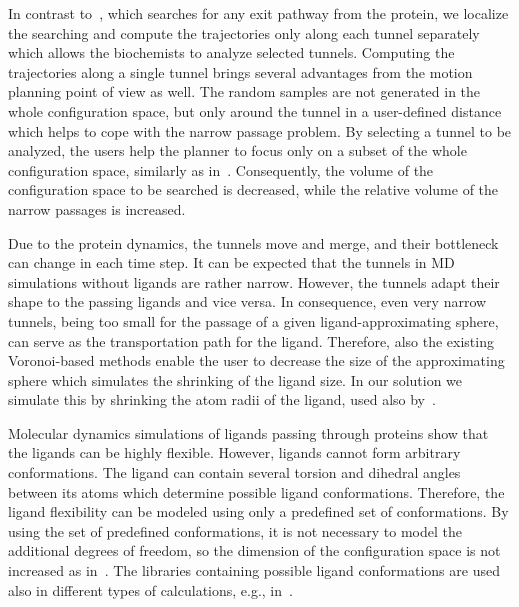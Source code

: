 \documentclass[usletter, 10pt, conference]{ieeeconf} %
\begin{document}
In contrast to~\cite{cortes2010simulating}, which searches for any exit pathway from the protein, we localize the searching and compute the trajectories only along each tunnel separately which allows the biochemists to analyze selected tunnels.
Computing the trajectories along a single tunnel brings several advantages from the motion planning point of view as well.
The random samples are not generated in the whole configuration space, but only around the tunnel in a user-defined distance which helps to cope with the narrow passage problem.
By selecting a tunnel to be analyzed, the users help the planner to focus only on a subset of the whole configuration
space, similarly as in~\cite{denny2018general}.
Consequently, the volume of the configuration space to be searched is decreased, while the relative volume of the narrow passages is increased.

Due to the protein dynamics, the tunnels move and merge, and their bottleneck can change in each time step.
It can be expected that the tunnels in MD simulations without ligands are rather narrow.
However, the tunnels adapt their shape to the passing ligands and vice versa.
In consequence, even very narrow tunnels, being too small for the passage of a given ligand-approximating sphere, can serve as the transportation path for the ligand.
Therefore, also the existing Voronoi-based methods enable the user to decrease the size of the approximating sphere which simulates the shrinking of the ligand size.
In our solution we simulate this by shrinking the atom radii of the ligand, used also by~\cite{cortes2010simulating,guieysse2008structure}.

Molecular dynamics simulations of ligands passing through proteins show that the ligands can be highly flexible.
However, ligands cannot form arbitrary conformations. 
The ligand can contain several torsion and dihedral angles between its atoms which determine possible ligand conformations.
Therefore, the ligand flexibility can be modeled using only a predefined set of conformations.
By using the set of predefined conformations, it is not necessary to model the additional degrees of freedom, so 
the dimension of the configuration space is not increased as in~\cite{cortes2010simulating}.
The libraries containing possible ligand conformations are used also in different types of calculations, e.g., in~\cite{kellogg}. 
\end{document}
